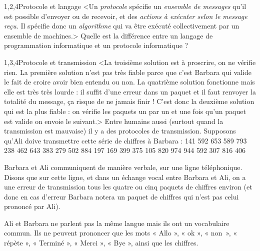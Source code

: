 \begin{quiz}[title={Internet}]
\begin{quizquestion*}[b]{3}{1,2,4}{Protocole et langage}
<Un \emph{protocole} spécifie un \emph{ensemble de messages} qu’il est possible d’envoyer ou de recevoir, et des \emph{actions à exécuter selon le message reçu}. Il spécifie donc un \emph{algorithme} qui va être exécuté collectivement par un ensemble de machines.>
Quelle est la différence entre un langage de programmation informatique et un protocole informatique ? 
\end{quizquestion*}

\begin{quizquestion*}[b]{2}{1,3,4}{Protocole et transmission}
<La troisième solution est à proscrire, on ne vérifie rien.
La première solution n'est pas très fiable parce que c'est Barbara qui valide le fait de croire avoir bien entendu ou non.
La quatrième solution fonctionne mais elle est très très lourde : il suffit d'une erreur dans un paquet et il faut renvoyer la totalité du message, ça risque de ne jamais finir !
C'est donc la deuxième solution qui est la plus fiable : on vérifie les paquets un par un et une fois qu'un paquet est valide on envoie le suivant.>
Entre humains aussi (surtout quand la transmission est mauvaise) il y a des protocoles de transmission. Supposons qu’Ali doive transmettre cette série de chiffres à Barbara :
141 592 653 589 793 238 462 643 383 279 502 884 197 169 399 375 105 820 974 944 592 307 816 406

Barbara et Ali communiquent de manière verbale, sur une ligne téléphonique.
Disons que sur cette ligne, et dans un échange vocal entre Barbara et Ali, on a une erreur de transmission tous les quatre ou cinq paquets de chiffres environ (et donc en cas d’erreur Barbara notera un paquet de chiffres qui n’est pas celui prononcé par Ali).

Ali et Barbara ne parlent pas la même langue mais ils ont un vocabulaire commun. Ils ne peuvent prononcer que les mots « Allo », « ok », « non~», « répète », « Terminé », « Merci », « Bye », ainsi que les chiffres.


\end{quizquestion*}
\end{quiz}

